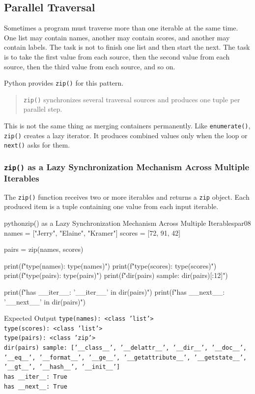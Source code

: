 \subsection{Parallel Traversal}

Sometimes a program must traverse more than one iterable at the same time. One list may contain names, another may contain scores, and another may contain labels. The task is not to finish one list and then start the next. The task is to take the first value from each source, then the second value from each source, then the third value from each source, and so on.

Python provides \texttt{zip()} for this pattern.

\begin{quote}
\texttt{zip()} synchronizes several traversal sources and produces one tuple per parallel step.
\end{quote}

This is not the same thing as merging containers permanently. Like \texttt{enumerate()}, \texttt{zip()} creates a lazy iterator. It produces combined values only when the loop or \texttt{next()} asks for them.

\subsubsection{\texttt{zip()} as a Lazy Synchronization Mechanism Across Multiple Iterables}

The \texttt{zip()} function receives two or more iterables and returns a \texttt{zip} object. Each produced item is a tuple containing one value from each input iterable.

\begin{codebox}[]{python}{zip() as a Lazy Synchronization Mechanism Across Multiple Iterables}{par08}
names = ["Jerry", "Elaine", "Kramer"]
scores = [72, 91, 42]

pairs = zip(names, scores)

print(f"type(names): {type(names)}")
print(f"type(scores): {type(scores)}")
print(f"type(pairs): {type(pairs)}")
print(f"dir(pairs) sample: {dir(pairs)[:12]}")

print(f"has __iter__: {'__iter__' in dir(pairs)}")
print(f"has __next__: {'__next__' in dir(pairs)}")
\end{codebox}


\begin{iobox}{Expected Output}
\texttt{type(names): <class 'list'>} \\
\texttt{type(scores): <class 'list'>} \\
\texttt{type(pairs): <class 'zip'>} \\
\texttt{dir(pairs) sample: ['\_\_class\_\_', '\_\_delattr\_\_', '\_\_dir\_\_', '\_\_doc\_\_',} \\
\texttt{'\_\_eq\_\_', '\_\_format\_\_', '\_\_ge\_\_', '\_\_getattribute\_\_', '\_\_getstate\_\_',} \\
\texttt{'\_\_gt\_\_', '\_\_hash\_\_', '\_\_init\_\_']} \\
\texttt{has \_\_iter\_\_: True} \\
\texttt{has \_\_next\_\_: True} \\
\end{iobox}


